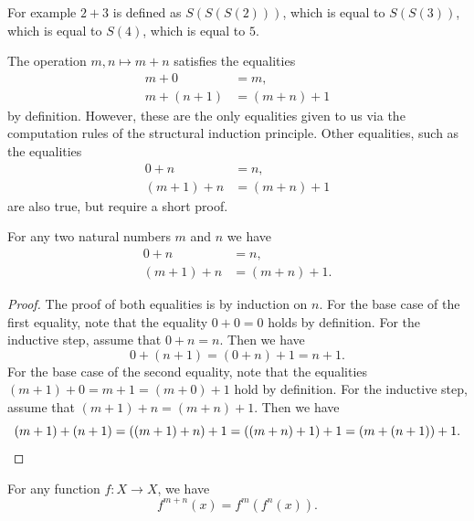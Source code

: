 For example $2+3$ is defined as $S(S(S(2)))$, which is equal to $S(S(3))$, which is equal to $S(4)$, which is equal to $5$.

The operation $m,n\mapsto m+n$ satisfies the equalities
\begin{align*}
  m+0 & = m, \\
  m+(n+1) & = (m+n)+1
\end{align*}
by definition. However, these are the only equalities given to us via the computation rules of the structural induction principle. Other equalities, such as the equalities
\begin{align*}
  0+n & = n, \\
  (m+1)+n & = (m+n)+1
\end{align*}
are also true, but require a short proof.

\begin{proposition}\label{proposition:unit-law-addition-nat}
  For any two natural numbers $m$ and $n$ we have
  \begin{align*}
    0+n & = n, \\
    (m+1)+n & = (m+n)+1.
  \end{align*}
\end{proposition}

\begin{proof}
  The proof of both equalities is by induction on $n$. For the base case of the first equality, note that the equality $0+0=0$ holds by definition. For the inductive step, assume that $0+n=n$. Then we have
  \begin{equation*}
    0+(n+1)=(0+n)+1= n+1.
  \end{equation*}
  For the base case of the second equality, note that the equalities $(m+1)+0=m+1=(m+0)+1$ hold by definition. For the inductive step, assume that $(m+1)+n=(m+n)+1$. Then we have
  \begin{equation*}
    (m+1)+(n+1)=((m+1)+n)+1=((m+n)+1)+1=(m+(n+1))+1.\qedhere
  \end{equation*}
\end{proof}

\begin{proposition}\label{proposition:iterate-add}
  For any function $f:X\to X$, we have
  \begin{equation*}
    f^{m+n}(x)=f^m(f^n(x)).
  \end{equation*}
\end{proposition}

